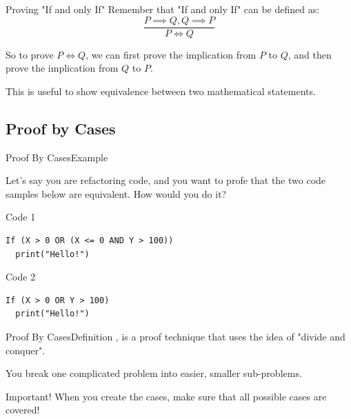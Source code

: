 \begin{frame}{Proving "If and only If"}
  Remember that "If and only If" can be defined as:
  \[
  \frac{P\implies Q, Q \implies P}{P\iff Q}
  \]

  So to prove $P\iff Q$, we can first prove the implication from $P$ to $Q$, and then prove the implication from $Q$ to $P$.\bigskip

  This is useful to show equivalence between two mathematical statements.
\end{frame}


\subsection{Proof by Cases}

\begin{frame}[fragile]{Proof By Cases}{Example}

  Let's say you are refactoring code, and you want to profe that the two code samples below are equivalent. How would you do it?
  \vfill

  \begin{block}{Code 1}
\begin{verbatim}
If (X > 0 OR (X <= 0 AND Y > 100))
  print("Hello!")
\end{verbatim}
  \end{block}
  \begin{block}{Code 2}
\begin{verbatim}
If (X > 0 OR Y > 100)
  print("Hello!")
\end{verbatim}
  \end{block}
\end{frame}

\begin{frame}{Proof By Cases}{Definition}
  , is a proof technique that uses the idea of "divide and conquer".\vfill

  You break one complicated problem into easier, smaller sub-problems.
  \vfill

  \alert{Important!} When you create the cases, make sure that all possible cases are covered!
\end{frame}


